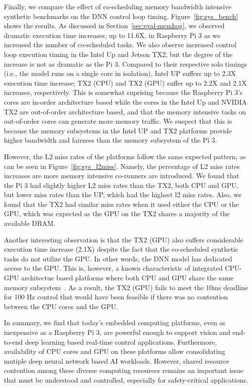 Finally, we compare the effect of co-scheduling memory bandwidth
intensive synthetic benchmarks on the DNN control loop timing. 
Figure~\ref{fig:sys_bench} shows the results.
As discussed in 
Section~\ref{sec:eval-memhog}, we observed dramatic execution time
increases, up to 11.6X, in Raspberry Pi 3 as we increased the number of
co-scheduled tasks. We also observe increased control loop execution
timing in the Intel Up and Jetson TX2, but the degree of the increase is 
not as dramatic as the Pi 3. Compared to their respective solo timings 
(i.e., the model runs on a single core in isolation), Intel UP suffers up to
2.3X execution time increase; TX2 (CPU) and TX2 (GPU) suffer up to
2.2X and 2.1X increases, respectively. This is somewhat suprising
because the Raspberry Pi 3's cores are in-order architecture based while
the cores in the Intel Up and NVIDIA TX2 are out-of-order architecture
based, and that the memory intensive tasks on out-of-order cores can
generate more memory traffic. We suspect that this is because the
memory subsystems in the Intel UP and TX2 platforms provide higher
bandwidth and fairness than the memory subsystem of the Pi 3.

However, the L2 miss rates of the platforms follow the same expected 
pattern, as can be seen in Figure~\ref{fig:sys_l2miss}. Namely, the 
percentage of L2 miss rates increases are more 
memory intensive co-runners are introduced. We found that the Pi 3 had 
slightly higher L2 miss rates than the TX2, both CPU and GPU, but lower 
miss rates than the UP, which had the highest l2 miss rates. Also, we
found that the TX2 had similar miss rates when it used either the CPU
or the GPU, which was expected as the GPU on the TX2 shares a majority 
of the available DRAM.

Another interesting observation is that the TX2 (GPU) also suffers
considerable execution time increase (2.1X) despite the fact that the
co-scheduled synthetic tasks do not utilize the GPU. In other words,
the DNN model has dedicated access to the GPU. This is, however, a
known characteristic of integrated CPU-GPU architectue based
platforms where both CPU and GPU share the same memory
subsystem~\cite{Ali2017}. As a result, the TX2 (GPU) fails to meet the
10ms deadline for 100 Hz control that would have been feasible if
there was no contention between the CPU cores and the GPU.

In summary, we find that today's embedded computing platforms, even as
inexpensive as a Raspberry Pi 3, are powerful enough to support
vision and end-to-end deep learning based real-time control
applications. Furthermore, availability of CPU cores and GPU on these
platforms allow consolidating mutiple deep neural network based AI
workloads. However, shared resource contention among these diverse
computing resources remains an important issue that must be understood
and controlled, especially for safety-critical applications.
